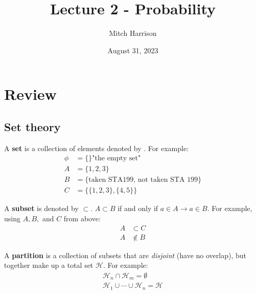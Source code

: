 \documentclass[titlepage, 12pt, leqno]{article}
\title{\Huge{Lecture 2 - Probability}}
\author{\large{Mitch Harrison}}
\date{August 31, 2023}
\begin{document}
\setlength{\parskip}{1\baselineskip}
\setlength{\parindent}{15pt}
\maketitle
\tableofcontents
\newpage


\section{Review}
\subsection{Set theory}

\begin{definition}
    A \textbf{set} is a collection of elements denoted by {}. For example:
    \begin{align*}
        \phi &= \{\} \text{"the empty set"}\\
        A &= \{1,2,3\} \\
        B &= \{ \text{taken STA199, not taken STA 199}\} \\
        C &= \{\{1,2,3\}, \{4,5\}\}
    \end{align*}
\end{definition}

\begin{definition}
    A \textbf{subset} is denoted by $ \subset $. $A \subset B$ if and only if
    $a \in A \rightarrow a \in B$. For example, using $A,B,$ and $C$ from above:
    \begin{align*}
        A & \subset C \\
        A & \notin B
    \end{align*}
\end{definition}

\begin{definition}
    A \textbf{partition} is a collection of subsets that are \textit{disjoint} 
    (have no overlap), but together make up a total set $ \mathcal{H}$. For
    example:
    \begin{align*}
        \mathcal{H}_n \cap \mathcal{H}_m = \emptyset \\
        \mathcal{H}_1 \cup \cdots \cup \mathcal{H}_n = \mathcal{H}
    \end{align*}
\end{definition}
\end{document}
